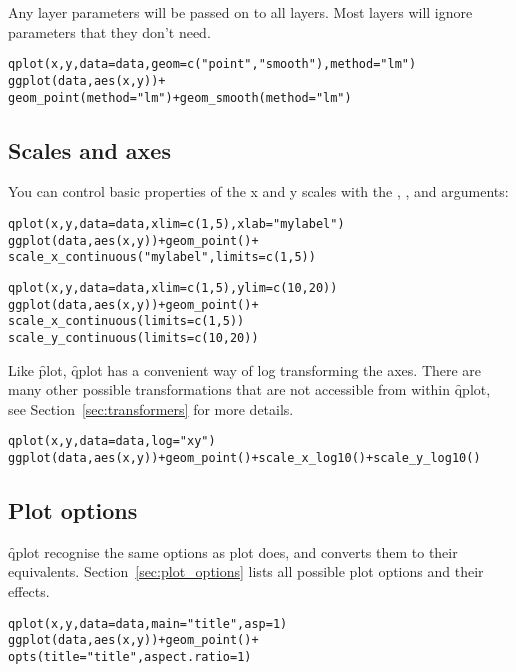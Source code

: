 Any layer parameters will be passed on to all layers.  Most layers will ignore parameters that they don't need.

\begin{alltt}
qplot(x, y, data = data, geom = c("point", "smooth"), method = "lm")
ggplot(data, aes(x, y)) + 
  geom_point(method = "lm") + geom_smooth(method = "lm")
\end{alltt}

\subsection{Scales and axes}

You can control basic properties of the x and y scales with the , ,  and  arguments:

\begin{alltt}
qplot(x, y, data = data, xlim = c(1, 5), xlab = "my label")
ggplot(data, aes(x, y)) + geom_point() + 
  scale_x_continuous("my label", limits = c(1, 5))

qplot(x, y, data = data, xlim = c(1, 5), ylim = c(10, 20))
ggplot(data, aes(x, y)) + geom_point() + 
  scale_x_continuous(limits = c(1, 5))
  scale_y_continuous(limits = c(10, 20))
\end{alltt}

Like \f{plot}, \f{qplot} has a convenient way of log transforming the axes.  There are many other possible transformations that are not accessible from within \f{qplot}, see Section~\ref{sec:transformers} for more details.

\begin{alltt}
qplot(x, y, data = data, log="xy")
ggplot(data, aes(x, y)) + geom_point() + scale_x_log10() + scale_y_log10()
\end{alltt}

\subsection{Plot options}

\f{qplot} recognise the same options as plot does, and converts them to their \ggplot equivalents.  Section~\ref{sec:plot_options} lists all possible plot options and their effects.

\begin{alltt}
qplot(x, y, data = data, main="title", asp = 1)
ggplot(data, aes(x, y)) + geom_point() + 
  opts(title = "title", aspect.ratio = 1)
\end{alltt}

